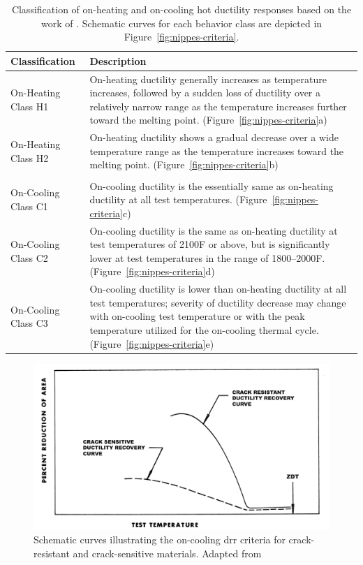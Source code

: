 \begin{table}[h]
\caption{Classification of on-heating and on-cooling hot ductility responses based on the work of \citet{nippes_further_1957}. Schematic curves for each behavior class are depicted in Figure~\ref{fig:nippes-criteria}.}
\begin{tabular}{ lp{4in} }
\toprule
\textbf{Classification} & \textbf{Description} \\
\midrule
On-Heating Class H1 & On-heating ductility generally increases as temperature increases, followed by a sudden loss of ductility over a relatively narrow range as the temperature increases further toward the melting point. (Figure~\ref{fig:nippes-criteria}a) \\
\addlinespace
On-Heating Class H2 & On-heating ductility shows a gradual decrease over a wide temperature range as the temperature increases toward the melting point. (Figure~\ref{fig:nippes-criteria}b) \\
& \\
On-Cooling Class C1 & On-cooling ductility is the essentially same as on-heating ductility at all test temperatures. (Figure~\ref{fig:nippes-criteria}c) \\
\addlinespace
On-Cooling Class C2 & On-cooling ductility is the same as on-heating ductility at test temperatures of 2100\textdegree{}F or above, but is significantly lower at test temperatures in the range of 1800--2000\textdegree{}F. (Figure~\ref{fig:nippes-criteria}d) \\
\addlinespace
On-Cooling Class C3 & On-cooling ductility is lower than on-heating ductility at all test temperatures; severity of ductility decrease may change with on-cooling test temperature or with the peak temperature utilized for the on-cooling thermal cycle. (Figure~\ref{fig:nippes-criteria}e) \\
\bottomrule
\end{tabular}
\label{tab:nippes-classification}
\end{table}


\begin{figure}
\centering
\includegraphics[width=\textwidth]{figures/hot-ductility/DRR-schematic.png}
\caption{Schematic curves illustrating the on-cooling \acrfull{drr} criteria for crack-resistant and crack-sensitive materials.  Adapted from \citet[Fig.~2]{yeniscavich_correlation_1970}}
\label{fig:drr-schematic}
\end{figure}

